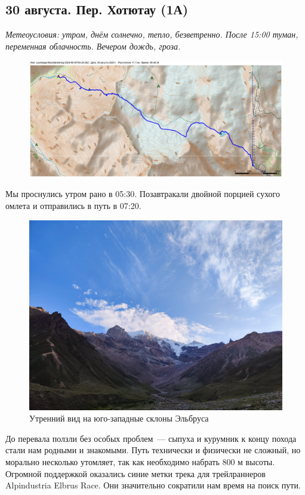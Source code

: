 \subsection{30 августа. Пер. Хотютау (1А)}
\textit{Метеоусловия: утром, днём солнечно, тепло, безветренно. После 15:00 туман, переменная облачность. Вечером дождь, гроза.}

\begin{figure}[h!]
	\centering
	\includegraphics[angle=0, width=0.7\linewidth]{../pics/mini_maps/30}
	\label{fig:mini_30}
\end{figure}





Мы проснулись утром рано в 05:30. Позавтракали двойной порцией сухого омлета и отправились в путь в 07:20.

\begin{figure}[h!]
	\centering
	\includegraphics[width=0.7\linewidth]{../pics/IMG_20240830_063548}
	\caption{Утренний вид на юго-западные склоны Эльбруса}
	\label{fig:IMG_20240830_063548}
\end{figure}

До перевала ползли без особых проблем~--- сыпуха и курумник к концу похода стали нам родными и знакомыми. Путь технически и физически не сложный, но морально несколько утомляет, так как необходимо набрать 800 м высоты. Огромной поддержкой оказались синие метки трека для трейлраннеров Alpindustria Elbrus Race. Они значительно сократили нам время на поиск пути.


